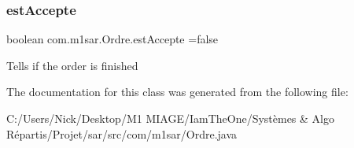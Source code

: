 \subsubsection{\texorpdfstring{est\+Accepte}{estAccepte}}
{\footnotesize\ttfamily boolean com.\+m1sar.\+Ordre.\+est\+Accepte =false}

Tells if the order is finished 

The documentation for this class was generated from the following file\+:\begin{DoxyCompactItemize}
\item 
C\+:/\+Users/\+Nick/\+Desktop/\+M1 M\+I\+A\+G\+E/\+Iam\+The\+One/\+Systèmes \& Algo Répartis/\+Projet/sar/src/com/m1sar/Ordre.\+java\end{DoxyCompactItemize}
